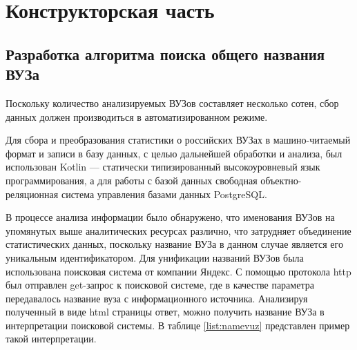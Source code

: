 \section{Конструкторская часть}

\subsection{Разработка алгоритма поиска общего названия ВУЗа}

Поскольку количество анализируемых ВУЗов составляет несколько сотен, сбор данных должен производиться в автоматизированном режиме.

Для сбора и преобразования статистики о российских ВУЗах в машино-читаемый формат и записи в базу данных, с целью дальнейшей обработки и анализа, был использован Kotlin — статически типизированный высокоуровневый язык программирования\cite{Kotlin}, а для работы с базой данных свободная объектно-реляционная система управления базами данных PostgreSQL\cite{postgresql}.

В процессе анализа информации было обнаружено, что именования ВУЗов на упомянутых выше аналитических ресурсах различно, что затрудняет объединение статистических данных, поскольку название ВУЗа в данном случае является его уникальным идентификатором. Для унификации названий ВУЗов была использована поисковая система от компании Яндекс. С помощью протокола http был отправлен get-запрос к поисковой системе, где в качестве параметра передавалось название вуза с информационного источника. Анализируя полученный в виде html страницы ответ, можно получить название ВУЗа в интерпретации поисковой системы. В таблице \ref{list:namevuz} представлен пример такой интерпретации.

